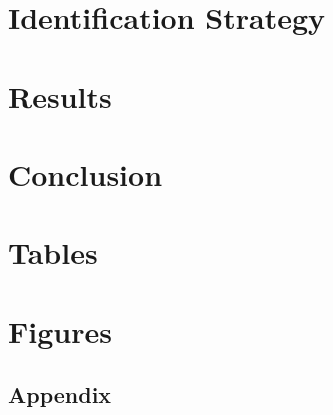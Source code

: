 \documentclass[11pt]{article}
\begin{document}
		\lipsum[1-1]
		
	\section{Identification Strategy}\label{identification}
	
		\lipsum[1-1]
		
	\section{Results}\label{results}
	
		\lipsum[1-1]
		
	\section{Conclusion}\label{conclusion}
	
		\lipsum[1-1]
		
	\section{Tables}\label{tables}
		
	\section{Figures}\label{figures}
	
	
	\newpage
	\appendix
	
	\begin{center} \section*{\hfill Appendix \hfill} \end{center}
	
	\setcounter{table}{0}
	\renewcommand{\thetable}{A\arabic{table}}
	\setcounter{figure}{0}
	\renewcommand{\thefigure}{A\arabic{figure}}
	\setcounter{footnote}{0}
	\renewcommand{\thefootnote}{A\arabic{footnote}}

	
\end{document}
